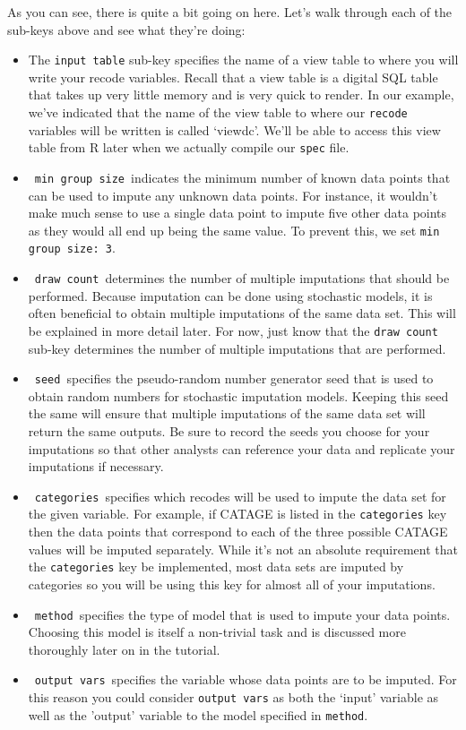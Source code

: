 \documentclass{article}
\begin{document}
As you can see, there is quite a bit going on here. Let's walk through each of the sub-keys 
above and see what they're doing:
\begin{itemize}
\item The {\tt input table} sub-key specifies the name of a view table to 
where you will write your recode variables. Recall that a view table is a digital SQL table 
that takes up very little memory and is very quick to render. In our example, we've indicated 
that the name of the view table to where our {\tt recode} variables will be written is 
called `viewdc'. We'll be able to access this view table from R later when we actually 
compile our {\tt spec} file.\\
\item \ {\tt min group size}\ indicates the minimum number of known data points that can be 
used to impute any unknown data points. For instance, it wouldn't make much sense to use a single 
data point to impute five other data points as they would all end up being the same value. To 
prevent this, we set {\tt min group size: 3}.\\
\item \ {\tt draw count}\ determines the number of multiple imputations that should be performed. 
Because imputation can be done using stochastic models, it is often beneficial to obtain multiple 
imputations of the same data set. This will be explained in more detail later. For now, just know 
that the {\tt draw count} sub-key determines the number of multiple imputations that are performed.\\
\item \ {\tt seed}\ specifies the pseudo-random number generator seed that is used to obtain 
random numbers for stochastic imputation models. Keeping this seed the same will ensure that multiple imputations of the same data set will return the same outputs. Be sure to record the seeds you choose for your 
imputations so that other analysts can reference your data and replicate your imputations if necessary.\\
\item \ {\tt categories}\  specifies which recodes will be used to impute the data set for 
the given variable. For example, if CATAGE is listed in the {\tt categories} key then the 
data points that correspond to each of the three possible CATAGE values will be imputed 
separately. While it's not an absolute requirement that the {\tt categories} key be implemented, most data 
sets are imputed by categories so you will be using this key for almost all of your imputations.\\
\item \ {\tt method}\ specifies the type of model that is used to impute your data points. 
Choosing this model is itself a non-trivial task and is discussed more thoroughly later on 
in the tutorial.\\
\item \ {\tt output vars}\ specifies the variable whose data points are to be imputed. For this reason 
you could consider {\tt output vars} as both the `input' variable as well as the 'output' variable 
to the model specified in {\tt method}.\\
\end{itemize}
\end{document}
